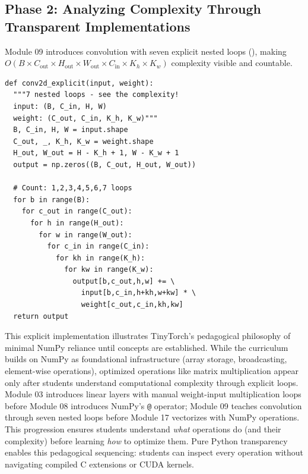 \documentclass[10pt,twocolumn]{article}
\begin{document}
\subsection{Phase 2: Analyzing Complexity Through Transparent Implementations}

Module 09 introduces convolution with seven explicit nested loops (), making $O(B \times C_{\text{out}} \times H_{\text{out}} \times W_{\text{out}} \times C_{\text{in}} \times K_h \times K_w)$ complexity visible and countable.

\begin{lstlisting}[caption={\textbf{Explicit Convolution.} Seven nested loops reveal $O(C_{out} \times H \times W \times C_{in} \times K^2)$ complexity.},label={lst:conv-explicit},float=t]
def conv2d_explicit(input, weight):
  """7 nested loops - see the complexity!
  input: (B, C_in, H, W)
  weight: (C_out, C_in, K_h, K_w)"""
  B, C_in, H, W = input.shape
  C_out, _, K_h, K_w = weight.shape
  H_out, W_out = H - K_h + 1, W - K_w + 1
  output = np.zeros((B, C_out, H_out, W_out))

  # Count: 1,2,3,4,5,6,7 loops
  for b in range(B):
    for c_out in range(C_out):
      for h in range(H_out):
        for w in range(W_out):
          for c_in in range(C_in):
            for kh in range(K_h):
              for kw in range(K_w):
                output[b,c_out,h,w] += \
                  input[b,c_in,h+kh,w+kw] * \
                  weight[c_out,c_in,kh,kw]
  return output
\end{lstlisting}

This explicit implementation illustrates TinyTorch's pedagogical philosophy of minimal NumPy reliance until concepts are established. While the curriculum builds on NumPy as foundational infrastructure (array storage, broadcasting, element-wise operations), optimized operations like matrix multiplication appear only after students understand computational complexity through explicit loops. Module 03 introduces linear layers with manual weight-input multiplication loops before Module 08 introduces NumPy's \texttt{@} operator; Module 09 teaches convolution through seven nested loops before Module 17 vectorizes with NumPy operations. This progression ensures students understand \emph{what} operations do (and their complexity) before learning \emph{how} to optimize them. Pure Python transparency enables this pedagogical sequencing: students can inspect every operation without navigating compiled C extensions or CUDA kernels.
\end{document}
